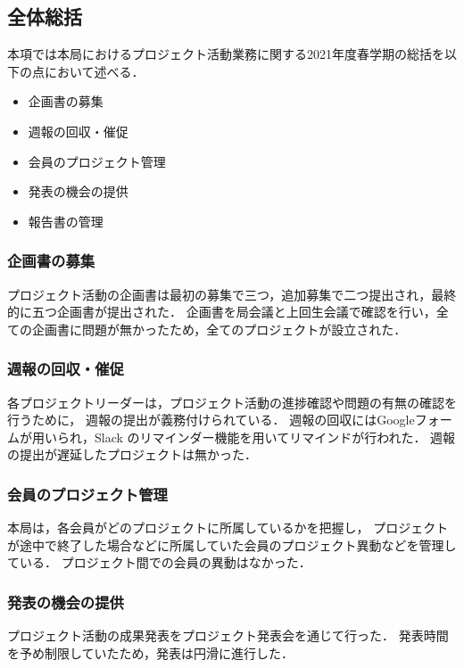 \subsection*{全体総括}


本項では本局におけるプロジェクト活動業務に関する2021年度春学期の総括を以下の点において述べる．

\begin{itemize}
\item 企画書の募集
\item 週報の回収・催促
\item 会員のプロジェクト管理
\item 発表の機会の提供
\item 報告書の管理
\end{itemize}

\subsubsection*{企画書の募集}

プロジェクト活動の企画書は最初の募集で三つ，追加募集で二つ提出され，最終的に五つ企画書が提出された．
企画書を局会議と上回生会議で確認を行い，全ての企画書に問題が無かったため，全てのプロジェクトが設立された．

\subsubsection*{週報の回収・催促}

各プロジェクトリーダーは，プロジェクト活動の進捗確認や問題の有無の確認を行うために，
週報の提出が義務付けられている．
週報の回収にはGoogleフォームが用いられ，Slack のリマインダー機能を用いてリマインドが行われた．
週報の提出が遅延したプロジェクトは無かった．

\subsubsection*{会員のプロジェクト管理}

本局は，各会員がどのプロジェクトに所属しているかを把握し，
プロジェクトが途中で終了した場合などに所属していた会員のプロジェクト異動などを管理している．
プロジェクト間での会員の異動はなかった．

\subsubsection*{発表の機会の提供}

プロジェクト活動の成果発表をプロジェクト発表会を通じて行った．
発表時間を予め制限していたため，発表は円滑に進行した．
